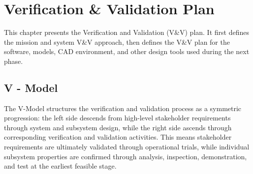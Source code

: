 \chapter{Verification \& Validation Plan}

This chapter presents the Verification and Validation (V\&V) plan. It first defines the mission and system V\&V approach, then defines the V\&V plan for the software, models, CAD environment, and other design tools used during the next phase.

\section{V - Model}
\label{sec:vmodel}

The V-Model structures the verification and validation process as a symmetric progression: the left side descends from high-level stakeholder requirements through system and subsystem design, while the right side ascends through corresponding verification and validation activities. This means stakeholder requirements are ultimately validated through operational trials, while individual subsystem properties are confirmed through analysis, inspection, demonstration, and test at the earliest feasible stage.



